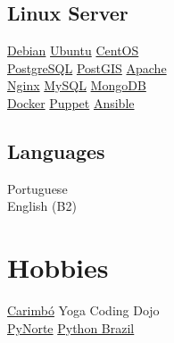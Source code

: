 \documentclass[]{joaosoares-resume}
\begin{document}
\begin{minipage}[t]{0.35\textwidth}
\subsection{Linux Server}
\href{http://www.debian.org/}{Debian}\textbullet{}
\href{http://www.ubuntu.com/}{Ubuntu}\textbullet{}
\href{http://www.centos.org/}{CentOS} \\
\href{http://www.postgresql.org/}{PostgreSQL}\textbullet{}
\href{http://www.postgis.net}{PostGIS}\textbullet{}
\href{http://httpd.apache.org/}{Apache}\\
\href{https://www.nginx.com/resources/wiki/}{Nginx}\textbullet{}
\href{https://www.mysql.com/}{MySQL} \textbullet{}
\href{https://www.mongodb.com/}{MongoDB} \\
\href{http://www.docker.com/}{Docker} \textbullet{}
\href{http://puppetlabs.com/}{Puppet} \textbullet{}
\href{https://www.ansible.com/}{Ansible} \\
\sectionsep

\subsection{Languages}
Portuguese \\
English (B2) \\
\sectionsep


\section{Hobbies}
\href{https://en.wikipedia.org/wiki/Carimbo}{Carimbó} \textbullet{} Yoga \textbullet{} Coding Dojo\\
\href{http://pynorte.python.org.br}{PyNorte} \textbullet{} \href{http://python.org.br}{Python Brazil} \\


\end{minipage}
\end{document}
